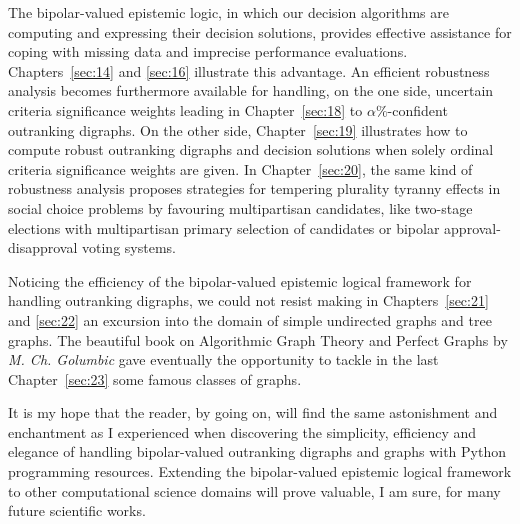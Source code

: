 The bipolar-valued epistemic logic, in which our decision algorithms are computing and expressing their decision solutions, provides effective assistance for coping with missing data and imprecise performance evaluations. Chapters~\ref{sec:14} and \ref{sec:16} illustrate this advantage. An efficient robustness analysis becomes furthermore available for handling, on the one side, uncertain criteria significance weights leading in Chapter~\ref{sec:18} to $\alpha\%$-confident outranking digraphs. On the other side, Chapter~\ref{sec:19} illustrates how to compute robust outranking digraphs and decision solutions when solely ordinal criteria significance weights are given. In Chapter~\ref{sec:20}, the same kind of robustness analysis proposes strategies for tempering plurality tyranny effects in social choice problems by favouring multipartisan candidates, like two-stage elections with multipartisan primary selection of candidates or bipolar approval-disapproval voting systems.

Noticing the efficiency of the bipolar-valued epistemic logical framework for handling outranking digraphs, we could not resist making in Chapters~\ref{sec:21} and \ref{sec:22} an excursion into the domain of simple undirected graphs and tree graphs. The beautiful book on Algorithmic Graph Theory and Perfect Graphs by \emph{M. Ch. Golumbic} gave eventually the opportunity to tackle in the last Chapter~\ref{sec:23} some famous classes of \Berge graphs.

\vspace{\baselineskip}
It is my hope that the reader, by going on, will find the same astonishment and enchantment as I experienced when discovering the simplicity, efficiency and elegance of handling bipolar-valued outranking digraphs and graphs with Python programming resources. Extending the bipolar-valued epistemic logical framework to other computational science domains will prove valuable, I am sure, for many future scientific works. 

% 
% 
